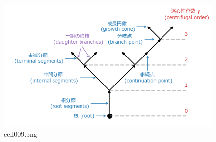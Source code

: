 \begin{figure}[ht]
	\centering
	\includegraphics[scale=0.8, max width=\linewidth]{./fig/neuron-model/neurite-growth-model/cell009.png}
	\caption{cell009.png}
	\label{cell009.png}
\end{figure}